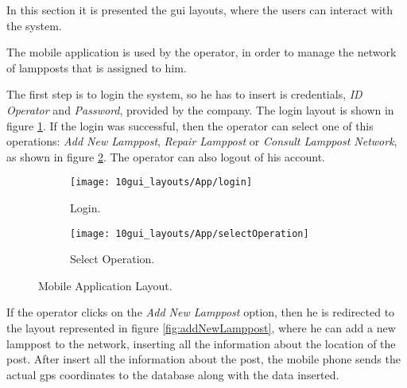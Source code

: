 In this section it is presented the \ac{gui} layouts, where the users can interact with the system.


The mobile application is used by the operator, in order to manage the network of lampposts that is assigned to him. 

The first step is to login the system, so he has to insert is credentials, \textit{ID Operator} and \textit{Password}, provided by the company. The login layout is shown in figure \ref{fig:login}. If the login was successful, then the operator can select one of this operations: \textit{Add New Lamppost}, \textit{Repair Lamppost} or \textit{Consult Lamppost Network}, as shown in figure \ref{fig:selectOperation}. The operator can also logout of his account.



\begin{figure}[H]
	\centering
	\begin{subfigure}{.4\textwidth}
		\centering
		\texttt{[image: 10gui\_layouts/App/login]}
		\caption{Login.}
		\label{fig:login}
	\end{subfigure}%
	\begin{subfigure}{.4\textwidth}
		\centering
		\texttt{[image: 10gui\_layouts/App/selectOperation]}
		\caption{Select Operation.}
		\label{fig:selectOperation}
	\end{subfigure}
	\caption{Mobile Application Layout.}
	\label{fig:App}
\end{figure}

If the operator clicks on the \textit{Add New Lamppost} option, then he is redirected to the layout represented in figure \ref{fig:addNewLamppost}, where he can add a new lamppost to the network, inserting all the information about the location of the post. After insert all the information about the post, the mobile phone sends the actual \ac{gps} coordinates to the database along with the data inserted. 

